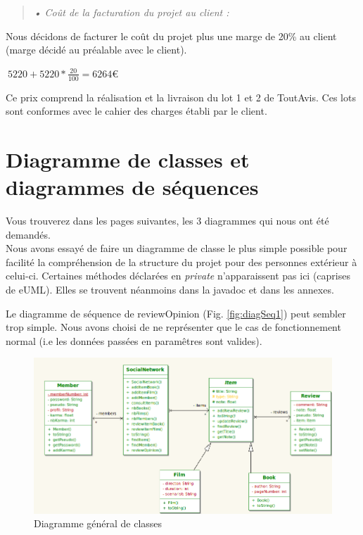 \documentclass[12pt,a4paper]{report}
\begin{document}
\begin{quotation}
\textit{• Coût de la facturation du projet au client :}
\end{quotation}

Nous décidons de facturer le coût du projet plus une marge de 20\% au client (marge décidé au préalable avec le client).

$\ 5220+5220* \frac{20}{100} = 6264$\euro{}

Ce prix comprend la réalisation et la livraison du lot 1 et 2 de ToutAvis. Ces lots sont conformes avec le cahier des charges établi par le client.

\chapter*{Diagramme de classes et diagrammes de séquences}

\label{chapter:Diagramme de classes et diagrammes de séquences} %
Vous trouverez dans les pages suivantes, les 3 diagrammes qui nous ont été demandés. \\

Nous avons essayé de faire un diagramme de classe le plus simple possible pour facilité la compréhension de la structure du projet pour des personnes extérieur à celui-ci. Certaines méthodes déclarées en \emph{private} n'apparaissent pas ici (caprises de eUML). Elles se trouvent néanmoins dans la javadoc et dans les annexes.

Le diagramme de séquence de reviewOpinion (Fig. \ref{fig:diagSeq1}) peut sembler trop simple. Nous avons choisi de ne représenter que le cas de fonctionnement normal (i.e les données passées en paramêtres sont valides). 

\begin{figure}[h]
\centering
\includegraphics[angle = 90, scale=0.85]{Classe1.png}
\caption{Diagramme général de classes}
\label{fig:diagClasses1}
\end{figure}
\end{document}
